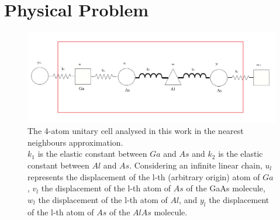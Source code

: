 \documentclass{article}
\begin{document}
	\section*{Physical Problem}

\begin{figure}
	\centering
	\includegraphics[width=0.7\linewidth]{cella.png}
	\caption{The 4-atom unitary cell analysed in this work in the nearest neighbours approximation.\\
	$k_1$ is the elastic constant between $Ga$ and $As$ and $k_2$ is the elastic constant between $Al$ and $As$. Considering an infinite linear chain, $u_l$ represents the displacement of the l-th (arbitrary origin) atom of $Ga$, $v_l$ the displacement of the l-th atom of $As$ of the GaAs molecule, $w_l$ the displacement of the l-th atom of $Al$, and  $y_l$ the displacement of the l-th atom of $As$ of the $AlAs$ molecule.   }
	\label{fig:cella}
\end{figure}
\end{document}
